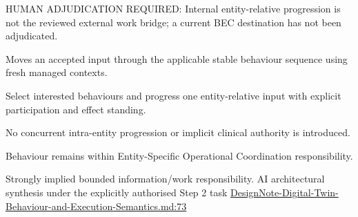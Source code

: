HUMAN ADJUDICATION REQUIRED: Internal entity-relative progression is not the reviewed external work bridge; a current BEC destination has not been adjudicated.



Moves an accepted input through the applicable stable behaviour sequence using fresh managed contexts.



Select interested behaviours and progress one entity-relative input with explicit participation and effect standing.



No concurrent intra-entity progression or implicit clinical authority is introduced.



Behaviour remains within Entity-Specific Operational Coordination responsibility.


Strongly implied bounded information/work responsibility. AI architectural synthesis under the explicitly authorised Step 2 task \hyperref[evidence:ec6250f7cf7c29a5]{DesignNote-Digital-Twin-Behaviour-and-Execution-Semantics.md:73}
